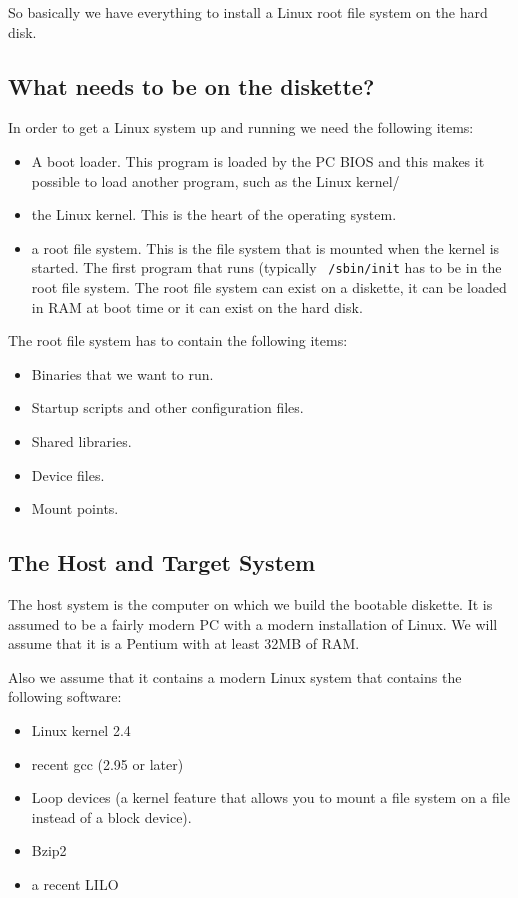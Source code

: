 \documentclass[12pt,a4paper]{article}
\begin{document}
So basically we have everything to install a Linux root file system on
the hard disk.

\subsection{What needs to be on the diskette?}

In order to get a Linux system up and running we need the following items:
\begin{itemize}
\item A boot loader. This  program is loaded by the PC BIOS and this
  makes it possible to load another program, such as the Linux kernel/
\item the Linux kernel. This is the heart of the operating system.
\item a root file system. This is the file system that is mounted when
  the kernel is started. The first program that runs (typically {\tt
  /sbin/init} has to be in the root file system. The root file system
  can exist on a diskette, it can be loaded in RAM at boot time or it
  can exist on the hard disk.
\end{itemize}

The root file system has to contain the following items:
\begin{itemize}
\item Binaries that we want to run.
\item Startup scripts and other configuration files.
\item Shared libraries.
\item Device files.
\item Mount points.
\end{itemize}


\subsection{The Host and Target System}

The host system is the computer on which we build the bootable
diskette. It is assumed to be a fairly modern PC with a modern
installation of Linux. We will assume that it is a Pentium with at
least 32MB of RAM.

Also we assume that it contains a modern Linux system that contains
the following software:
\begin{itemize}
\item Linux kernel 2.4
\item recent gcc (2.95 or later)
\item Loop devices (a kernel feature that allows you to mount a file
  system on a file instead of a block device).
\item Bzip2
\item a recent LILO
\end{itemize}
\end{document}
